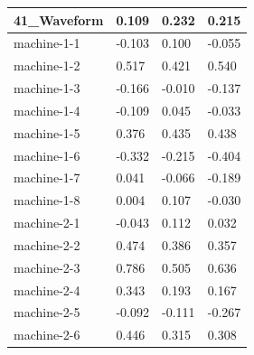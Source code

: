{\begin{tabular}{|l|l|l|l|}
41\_Waveform    & 0.109                                  & 0.232                                 & 0.215                         \\ \hline
machine-1-1     & -0.103                                 & 0.100                                 & -0.055                        \\ \hline
machine-1-2     & 0.517                                  & 0.421                                 & 0.540                         \\ \hline
machine-1-3     & -0.166                                 & -0.010                                & -0.137                        \\ \hline
machine-1-4     & -0.109                                 & 0.045                                 & -0.033                        \\ \hline
machine-1-5     & 0.376                                  & 0.435                                 & 0.438                         \\ \hline
machine-1-6     & -0.332                                 & -0.215                                & -0.404                        \\ \hline
machine-1-7     & 0.041                                  & -0.066                                & -0.189                        \\ \hline
machine-1-8     & 0.004                                  & 0.107                                 & -0.030                        \\ \hline
machine-2-1     & -0.043                                 & 0.112                                 & 0.032                         \\ \hline
machine-2-2     & 0.474                                  & 0.386                                 & 0.357                         \\ \hline
machine-2-3     & 0.786                                  & 0.505                                 & 0.636                         \\ \hline
machine-2-4     & 0.343                                  & 0.193                                 & 0.167                         \\ \hline
machine-2-5     & -0.092                                 & -0.111                                & -0.267                        \\ \hline
machine-2-6     & 0.446                                  & 0.315                                 & 0.308                         \\ \hline

\end{tabular}}
